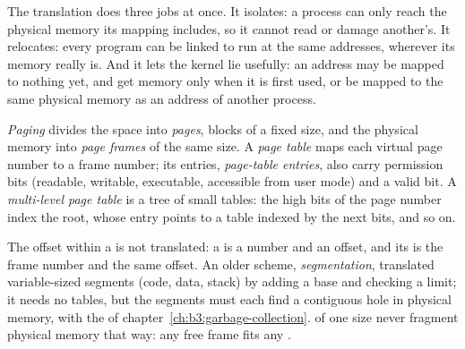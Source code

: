 The translation does three jobs at once. It isolates: a process can only reach the physical memory its mapping includes, so it cannot read or damage another's. It relocates: every program can be linked to run at the same addresses, wherever its memory really is. And it lets the kernel lie usefully: an address may be mapped to nothing yet, and get memory only when it is first used, or be mapped to the same physical memory as an address of another process.

\begin{definition}\label{def:b3:virtual-memory:paging}
\emph{Paging} divides the  space into \emph{pages}, blocks of a fixed size, and the physical memory into \emph{page frames} of the same size. A \emph{page table} maps each virtual page number to a frame number; its entries, \emph{page-table entries}, also carry permission bits (readable, writable, executable, accessible from user mode) and a valid bit. A \emph{multi-level page table} is a tree of small tables: the high bits of the page number index the root, whose entry points to a table indexed by the next bits, and so on.
\end{definition}

The offset within a  is not translated: a  is a  number and an offset, and its  is the frame number and the same offset. An older scheme, \emph{segmentation}, translated variable-sized segments (code, data, stack) by adding a base and checking a limit; it needs no tables, but the segments must each find a contiguous hole in physical memory, with the  of chapter~\ref{ch:b3:garbage-collection}.  of one size never fragment physical memory that way: any free frame fits any .

